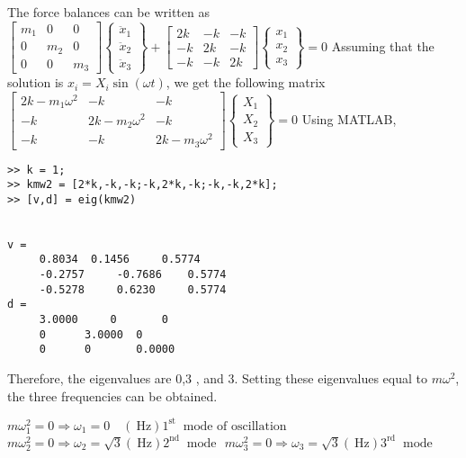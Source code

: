 \documentclass[../main.tex]{subfiles}
\begin{document}
\section{}
The force balances can be written as
	\bigbreak
$
\left[\begin{array}{ccc}
m_{1} & 0 & 0 \\
0 & m_{2} & 0 \\
0 & 0 & m_{3}
\end{array}\right]\left\{\begin{array}{l}
\ddot{x}_{1} \\
\ddot{x}_{2} \\
\ddot{x}_{3}
\end{array}\right\}+\left[\begin{array}{ccc}
2 k & -k & -k \\
-k & 2 k & -k \\
-k & -k & 2 k
\end{array}\right]\left\{\begin{array}{l}
x_{1} \\
x_{2} \\
x_{3}
\end{array}\right\}=0
$
	\bigbreak
Assuming that the solution is $x_{i}=X_{i} \sin (\omega t)$, we get the following matrix
	\bigbreak
$
\left[\begin{array}{ccc}
2 k-m_{1} \omega^{2} & -k & -k \\
-k & 2 k-m_{2} \omega^{2} & -k \\
-k & -k & 2 k-m_{3} \omega^{2}
\end{array}\right]\left\{\begin{array}{c}
X_{1} \\
X_{2} \\
X_{3}
\end{array}\right\}=0
$
	\bigbreak
Using MATLAB,
	\bigbreak
\begin{lstlisting}[numbers=none]
>> k = 1;
>> kmw2 = [2*k,-k,-k;-k,2*k,-k;-k,-k,2*k];
>> [v,d] = eig(kmw2)


v =
	 0.8034	 0.1456 	0.5774
	 -0.2757	 -0.7686 	0.5774
	 -0.5278	 0.6230 	0.5774
d =
	 3.0000 	0 		0
	 0 		3.0000 	0
	 0 		0 		0.0000
\end{lstlisting}
	\bigbreak
\begin{blockquote}
Therefore, the eigenvalues are 0,3 , and 3. Setting these eigenvalues equal to $m \omega^{2}$, the three frequencies can be obtained.
\end{blockquote}
	\bigbreak
$m \omega_{1}^{2}=0 \Rightarrow \omega_{1}=0 \quad(\mathrm{~Hz}) 1^{\text {st }} \text { mode of oscillation }$
	\bigbreak
$m \omega_{2}^{2}=0 \Rightarrow \omega_{2}=\sqrt{3}(\mathrm{~Hz}) 2^{\text {nd }} \text { mode }$
	\bigbreak
$m \omega_{3}^{2}=0 \Rightarrow \omega_{3}=\sqrt{3}(\mathrm{~Hz}) 3^{\text {rd }} \text { mode }$
	\bigbreak
\end{document}
